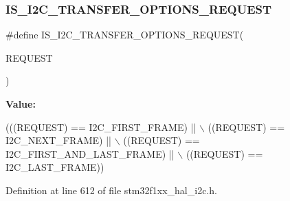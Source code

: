 \subsubsection{\texorpdfstring{I\+S\+\_\+\+I2\+C\+\_\+\+T\+R\+A\+N\+S\+F\+E\+R\+\_\+\+O\+P\+T\+I\+O\+N\+S\+\_\+\+R\+E\+Q\+U\+E\+ST}{IS\_I2C\_TRANSFER\_OPTIONS\_REQUEST}}
{\footnotesize\ttfamily \#define I\+S\+\_\+\+I2\+C\+\_\+\+T\+R\+A\+N\+S\+F\+E\+R\+\_\+\+O\+P\+T\+I\+O\+N\+S\+\_\+\+R\+E\+Q\+U\+E\+ST(\begin{DoxyParamCaption}\item[{}]{R\+E\+Q\+U\+E\+ST }\end{DoxyParamCaption})}

{\bfseries Value\+:}
\begin{DoxyCode}
(((REQUEST) == I2C\_FIRST\_FRAME)              || \(\backslash\)
                                                       ((REQUEST) == I2C\_NEXT\_FRAME)               || \(\backslash\)
                                                       ((REQUEST) == I2C\_FIRST\_AND\_LAST\_FRAME)     || \(\backslash\)
                                                       ((REQUEST) == I2C\_LAST\_FRAME))
\end{DoxyCode}


Definition at line 612 of file stm32f1xx\+\_\+hal\+\_\+i2c.\+h.


